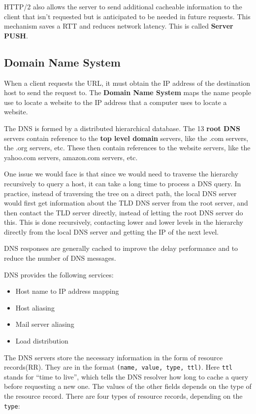 \documentclass[12pt,letterpaper]{article}
\theoremstyle{definition}
\begin{document}
HTTP/2 also allows the server to send additional cacheable information to the client that isn't requested but is anticipated to be needed in future requests. This mechanism saves a RTT and reduces network latency. This is called \textbf{Server PUSH}.

\subsection{Domain Name System}

When a client requests the URL, it must obtain the IP address of the destination host to send the request to. The \textbf{Domain Name System} maps the name people use to locate a website to the IP address that a computer uses to locate a website.

The DNS is formed by a distributed hierarchical database. The 13 \textbf{root DNS} servers contain reference to the \textbf{top level domain} servers, like the .com servers, the .org servers, etc. These then contain references to the website servers, like the yahoo.com servers, amazon.com servers, etc.

One issue we would face is that since we would need to traverse the hierarchy recursively to query a host, it can take a long time to process a DNS query. In practice, instead of traversing the tree on a direct path, the local DNS server would first get information about the TLD DNS server from the root server, and then contact the TLD server directly, instead of letting the root DNS server do this. This is done recursively, contacting lower and lower levels in the hierarchy directly from the local DNS server and getting the IP of the next level.

DNS responses are generally cached to improve the delay performance and to reduce the number of DNS messages.

DNS provides the following services:

\begin{itemize}
  \item Host name to IP address mapping
  \item Host aliasing
  \item Mail server aliasing
  \item Load distribution
\end{itemize}

The DNS servers store the necessary information in the form of resource records(RR). They are in the format \texttt{(name, value, type, ttl)}. Here \texttt{ttl} stands for ``time to live'', which tells the DNS resolver how long to cache a query before requesting a new one. The values of the other fields depends on the type of the resource record. There are four types of resource records, depending on the \texttt{type}:
\end{document}
